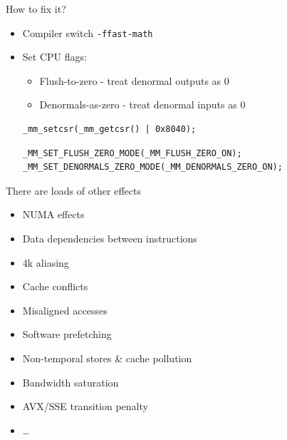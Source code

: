 \documentclass[hyperref={pdfpagelabels=false}]{beamer}
\begin{document}
\begin{frame}[fragile]{How to fix it?}
	\begin{itemize}
		\item Compiler switch \texttt{-ffast-math}
		\item<2-> Set CPU flags:
			\begin{itemize}
				\item Flush-to-zero - treat denormal outputs as 0
				\item Denormals-as-zero - treat denormal inputs as 0
			\end{itemize}

			\vspace{5mm}
			\begin{overprint}
				\begin{tcolorbox}
				\begin{verbatim}
_mm_setcsr(_mm_getcsr() | 0x8040);
				\end{verbatim}
				\end{tcolorbox}

				\begin{tcolorbox}
				\begin{verbatim}
_MM_SET_FLUSH_ZERO_MODE(_MM_FLUSH_ZERO_ON);
_MM_SET_DENORMALS_ZERO_MODE(_MM_DENORMALS_ZERO_ON);
				\end{verbatim}
				\end{tcolorbox}
			\end{overprint}
	\end{itemize}
\end{frame}

\begin{frame}{There are loads of other effects}
	\begin{itemize}
		\item NUMA effects
		\item Data dependencies between instructions
		\item 4k aliasing
		\item Cache conflicts
		\item Misaligned accesses
		\item Software prefetching
		\item Non-temporal stores \& cache pollution
		\item Bandwidth saturation
		\item AVX/SSE transition penalty
		\item \ldots
	\end{itemize}
\end{frame}
\end{document}
